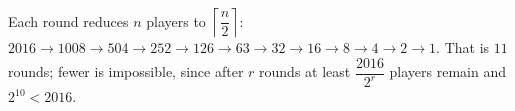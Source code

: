 Each round reduces $n$ players to $\left\lceil\dfrac {n}{2}\right\rceil$: $2016\to1008\to504\to252\to126\to63\to32\to16\to8\to4\to2\to1$. That is $\boxed{11}$ rounds; fewer is impossible, since after $r$ rounds at least $\dfrac{2016}{2^r}$ players remain and $2^{10}<2016$.
